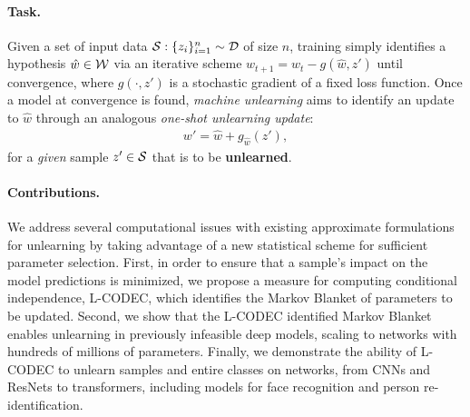 \paragraph{Task.} Given a set of input data $\mathcal{S}: \{z_i\}_{i=1}^n \sim \mathcal{D}$ of size $n$, training simply identifies a hypothesis $\hat{w} \in \mathcal{W}$  via an iterative scheme $w_{t+1} = w_t - g(\hat{w},z')$ until convergence, where $g(\cdot,z')$ is  a stochastic gradient of a fixed loss function. Once a model at convergence is found, \textit{machine unlearning} aims to identify an update to $\hat{w}$ through an analogous {\em one-shot unlearning update}:
\begin{align}\label{eq:unlearn}
    w' = \hat{w} + g_{\hat{w}}\left(z'\right),
\end{align}
for a \textit{given} sample $z' \in \mathcal{S}$ that is to be \textbf{unlearned}.

\paragraph{Contributions.} We address several computational issues with existing approximate formulations for unlearning by taking advantage of a new statistical scheme for sufficient parameter selection. 
First, in order to ensure that a sample's impact on the model predictions is minimized, we propose a measure for computing conditional independence, L-CODEC, which  identifies the Markov Blanket of parameters to be updated. 
Second, we show that the L-CODEC identified Markov Blanket enables unlearning in previously infeasible deep models, scaling to networks with hundreds of millions of parameters. 
Finally, we demonstrate the ability of L-CODEC to unlearn samples and entire classes on networks, from CNNs and ResNets to transformers, including models for face recognition and person re-identification.


